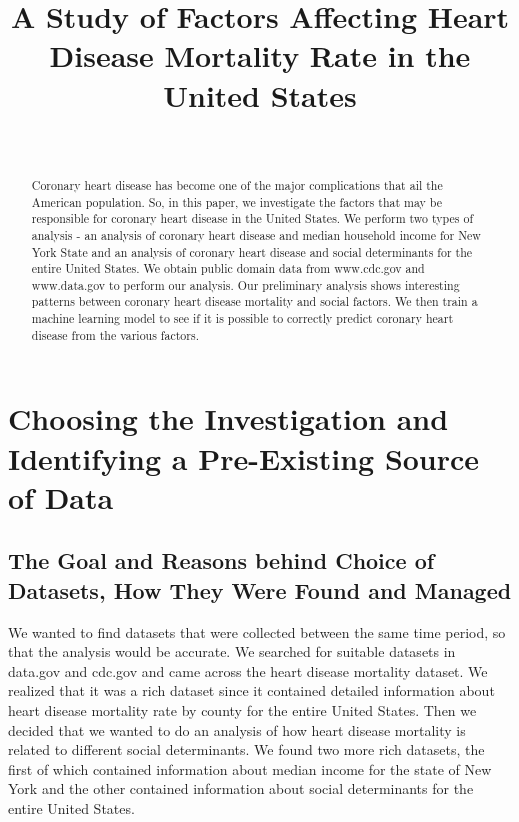 \documentclass[journal,12pt,onecolumn]{IEEEtran}
\begin{document}
\title{A Study of Factors Affecting Heart Disease Mortality Rate in the United States}

\author{
\\
}

\maketitle

\begin{abstract}
Coronary heart disease has become one of the major complications that ail the American population. 
So, in this paper, we investigate the factors that may be responsible for coronary heart disease in the United States.
We perform two types of analysis - an analysis of coronary heart disease and median household income for New York State and an analysis of coronary heart disease and social determinants for the entire United States.
We obtain public domain data from www.cdc.gov and www.data.gov to perform our analysis.
Our preliminary analysis shows interesting patterns between coronary heart disease mortality and social factors.
We then train a machine learning model to see if it is possible to correctly predict coronary heart disease from the various factors. 
 \end{abstract}
\section{Choosing the Investigation and Identifying a Pre-Existing Source of Data}
\subsection{The Goal and Reasons behind Choice of Datasets, How They Were Found and Managed}
We wanted to find datasets that were collected between the same time period, so that the analysis would be accurate.
We searched for suitable datasets in data.gov and cdc.gov and came across the heart disease mortality dataset. 
We realized that it was a rich dataset since it contained detailed information about heart disease mortality rate by county for the entire United States.
Then we decided that we wanted to do an analysis of how heart disease mortality is related to different social determinants.
We found two more rich datasets, the first of which contained information about median income for the state of New York and the other contained information about social determinants for the entire United States.
\end{document}
